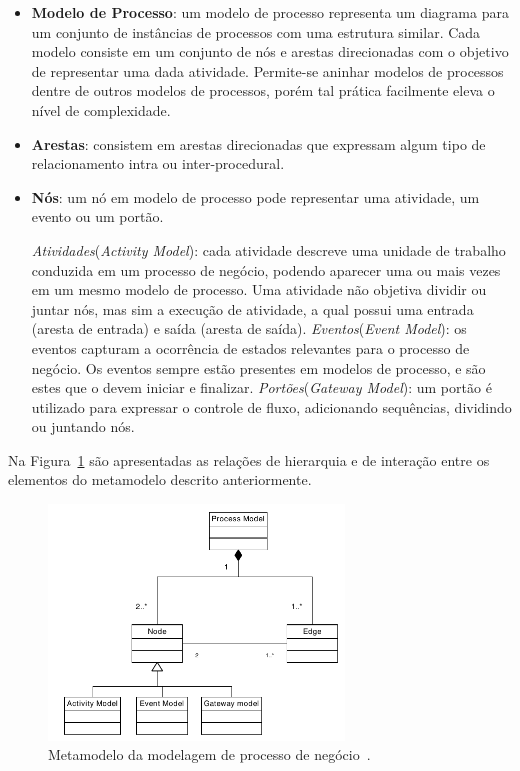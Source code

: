 \begin{itemize}
\item \textbf{Modelo de Processo}: um modelo de processo representa um diagrama para um conjunto de instâncias de processos com uma estrutura similar. Cada modelo consiste em um conjunto de nós e arestas direcionadas com o objetivo de representar uma dada atividade. Permite-se aninhar modelos de processos dentre de outros modelos de processos, porém tal prática facilmente eleva o nível de complexidade.

\item \textbf{Arestas}: consistem em arestas direcionadas que expressam algum tipo de relacionamento intra ou inter-procedural.
\item \textbf{Nós}: um nó em modelo de processo pode representar uma atividade, um evento ou um portão.
\begin{tasks}
	\task \textit{Atividades}(\textit{Activity Model}): cada atividade descreve uma unidade de trabalho conduzida em um processo de negócio, podendo aparecer uma ou mais vezes em um mesmo modelo de processo. Uma atividade não objetiva dividir ou juntar nós, mas sim a execução de atividade, a qual possui uma entrada (aresta de entrada) e saída (aresta de saída).
	\task \textit{Eventos}(\textit{Event Model}): os eventos capturam a ocorrência de estados relevantes para o processo de negócio. Os eventos sempre estão presentes em modelos de processo, e são estes que o devem iniciar e finalizar.
	\task \textit{Portões}(\textit{Gateway Model}): um portão é utilizado para expressar o controle de fluxo, adicionando sequências, dividindo ou juntando nós.
\end{tasks}

\end{itemize}

Na Figura~\ref{image:metamodelo} são apresentadas as relações de hierarquia e de interação entre os elementos do metamodelo descrito anteriormente.

\begin{figure}[!ht]
\centering
\includegraphics[width=0.7\textwidth]{images/metamodelo.png}
\caption{Metamodelo da modelagem de processo de negócio~\cite{Weske2012}.}
\label{image:metamodelo}
\end{figure}

